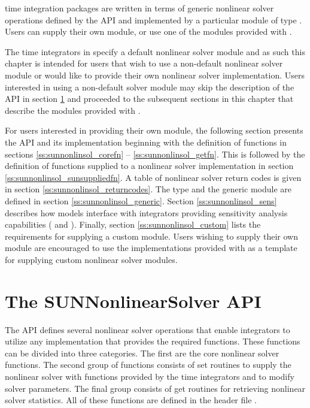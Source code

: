 {\sundials} time integration packages are written in terms of generic nonlinear
solver operations defined by the {\sunnonlinsol} API and implemented by a
particular {\sunnonlinsol} module of type \noindent{}.
Users can supply their own {\sunnonlinsol} module, or use one of the modules
provided with {\sundials}.

The time integrators in {\sundials} specify a default nonlinear solver module
and as such this chapter is intended for users that wish to use a non-default
nonlinear solver module or would like to provide their own nonlinear solver
implementation. Users interested in using a non-default solver module may skip
the description of the {\sunnonlinsol} API in section \ref{s:sunnonlinsol_api}
and proceeded to the subsequent sections in this chapter that describe the
{\sunnonlinsol} modules provided with {\sundials}.

For users interested in providing their own {\sunnonlinsol} module, the
following section presents the {\sunnonlinsol} API and its implementation
beginning with the definition of {\sunnonlinsol} functions in sections
\ref{ss:sunnonlinsol_corefn} -- \ref{ss:sunnonlinsol_getfn}. This is followed by
the definition of functions supplied to a nonlinear solver implementation in
section \ref{ss:sunnonlinsol_sunsuppliedfn}. A table of nonlinear solver return
codes is given in section \ref{ss:sunnonlinsol_returncodes}. The
 type and the generic {\sunnonlinsol} module are defined
in section \ref{ss:sunnonlinsol_generic}. Section \ref{ss:sunnonlinsol_sens}
describes how {\sunnonlinsol} models interface with {\sundials} integrators
providing sensitivity analysis capabilities ({\cvodes} and {\idas}). Finally,
section \ref{ss:sunnonlinsol_custom} lists the requirements for supplying a
custom {\sunnonlinsol} module. Users wishing to supply their own {\sunnonlinsol}
module are encouraged to use the {\sunnonlinsol} implementations provided with
{\sundials} as a template for supplying custom nonlinear solver
modules.


\section{The SUNNonlinearSolver API}
\label{s:sunnonlinsol_api}

The {\sunnonlinsol} API defines several nonlinear solver operations that enable
{\sundials} integrators to utilize any {\sunnonlinsol} implementation that
provides the required functions. These functions can be divided into three
categories. The first are the core nonlinear solver functions. The second group
of functions consists of set routines to supply the nonlinear solver with
functions provided by the {\sundials} time integrators and to modify solver
parameters. The final group consists of get routines for retrieving nonlinear
solver statistics. All of these functions are defined in the header file
.

